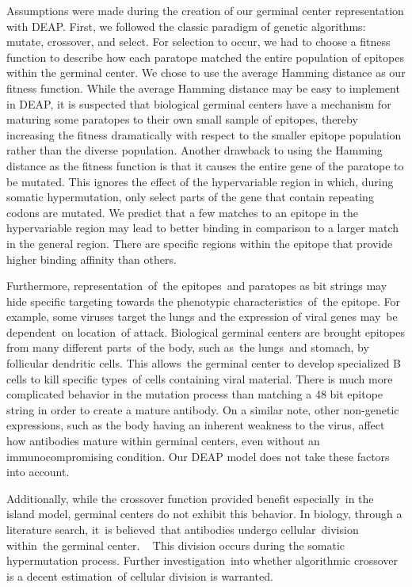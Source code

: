 \documentclass[conference]{IEEEtran}
\begin{document}
Assumptions were made during the creation of our germinal center representation with DEAP. First, we followed the classic paradigm of genetic algorithms: mutate, crossover, and select. For selection to occur, we had to choose a fitness function to describe how each paratope matched the entire population of epitopes within the germinal center. We chose to use the average Hamming distance as our fitness function. While the average Hamming distance may be easy to implement in DEAP, it is suspected that biological germinal centers have a mechanism for maturing some paratopes to their own small sample of epitopes, thereby increasing the fitness dramatically with respect to the smaller epitope population rather than the diverse population. Another drawback to using the Hamming distance as the fitness function is that it causes the entire gene of the paratope to be mutated. This ignores the effect of the hypervariable region in which, during somatic hypermutation, only select parts of the gene that contain repeating codons are mutated. We predict that a few matches to an epitope in the hypervariable region may lead to better binding in comparison to a larger match in the general region. \cite{b1}  There are specific regions within the epitope that provide higher binding affinity than others.

Furthermore, representation of the epitopes and paratopes as bit strings may hide specific targeting towards the phenotypic characteristics of the epitope. For example, some viruses target the lungs and the expression of viral genes may be dependent on location of attack. Biological germinal centers are brought epitopes from many different parts of the body, such as the lungs and stomach, by follicular dendritic cells. This allows the germinal center to develop specialized B cells to kill specific types of cells containing viral material. \cite{b3} There is much more complicated behavior in the mutation process than matching a 48 bit epitope string in order to create a mature antibody. On a similar note, other non-genetic expressions, such as the body having an inherent weakness to the virus, affect how antibodies mature within germinal centers, even without an immunocompromising condition. Our DEAP model does not take these factors into account.

Additionally, while the crossover function provided benefit especially in the island model, germinal centers do not exhibit this behavior. In biology, through a literature search, it is believed that antibodies undergo cellular division within the germinal center. \cite{b2}  This division occurs during the somatic hypermutation process. Further investigation into whether algorithmic crossover is a decent estimation of cellular division is warranted. 
\end{document}

